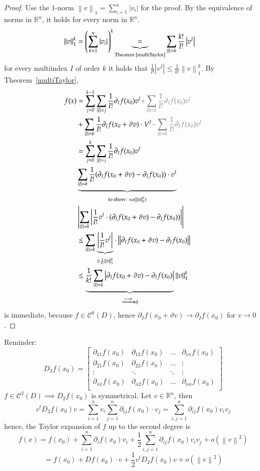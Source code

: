 \documentclass{article}
\newcommand{\norm}[1]{\left\|#1\right\|}
\newcommand{\card}[1]{\left|#1\right|}
\begin{document}
\begin{proof}
  Use the $1$-norm $\norm{v}_1 = \sum_{i=1}^n \card{v_i}$ for the proof. By the equivalence of norms in $\mathbb R^n$, it holds for every norm in $\mathbb R^n$.
  \begin{align*}
    \norm{v}_1^k &= \left(\sum_{k=1}^n \card{v_i}\right)^k \underbrace{=}_{\text{Theorem~\ref{multiTaylor}}}
                    \sum_{\card{I} = k} \frac{k!}{I!} \card{v^I}
  \end{align*}
  for every multiindex $I$ of order $k$ it holds that $\frac{1}{I!} \card{v^I} \leq \frac{1}{k!} \norm{v}_1^k$.
  By Theorem~\ref{multiTaylor},
  \begin{align*}
    f(x) &= \sum_{j=0}^{k-1} \sum_{\card{I}=j} \frac{1}{I!} \partial_I f(x_0) v^I {\color{gray} + \sum_{\card{I} = k} \frac{1}{I!} \partial_I f(x_0) v^I} \\
         &+ \sum_{\card{I} = k} \frac{1}{I!} \partial_I f(x_0 + \vartheta v) \cdot V^I {\color{gray} - \sum_{\card{I} = k} \frac{1}{I!} \partial_I f(x_0) v^I} \\
         &= \sum_{j=0}^k \sum_{\card{I}=j} \frac{1}{I!} \partial_I f(x_0) v^I \\
         & \underbrace{\sum_{\card{I}=k} \frac{1}{I!} (\partial_I f(x_0 + \vartheta v) - \partial_I f(x_0)) \cdot v^I}_{\text{to show: } = o(\norm{v}_1^k)} \\
         & \card{\sum_{\card{I} = k} \card{\frac{1}{I!} v^I \cdot (\partial_I f(x_0 + \vartheta v) - \partial_I f(x_0))}} \\
         & \leq \sum_{\card{I} = k} \underbrace{\card{\frac{1}{I!} v^I}}_{\leq \frac{1}{k!} \norm{v}_1^k} \cdot \norm{\partial_I f(x_0 + \vartheta v) - \partial_I f(x_0)} \\
         & \leq \underbrace{\frac{1}{k!} \sum_{\card{I} = k} \card{\partial_I f(x_0 + \vartheta v) - \partial_I f(x_0)}}_{\xrightarrow{v \to 0} 0} \norm{v}_1^k
  \end{align*}
  is immediate, because $f \in \mathcal C^k(D)$, hence $\partial_I f(x_0 + \vartheta v) \to \partial_I f(x_0)$ for $v \to 0$.
\end{proof}

Reminder:
\[
  D_2 f(x_0) = \begin{bmatrix}
    \partial_{11} f(x_0) & \partial_{12} f(x_0) & \dots & \partial_{1n} f(x_0) \\
    \partial_{21} f(x_0) & \partial_{22} f(x_0) & \dots & \vdots \\
    \vdots & \ddots & \ddots & \vdots \\
    \partial_{n1} f(x_0) & \partial_{n2} f(x_0) & \dots & \partial_{nn} f(x_0) \\
  \end{bmatrix}
\]
$f \in \mathcal C^2(D) \implies D_2 f(x_0)$ is symmetrical.
Let $v \in \mathbb R^n$, then
\[ v^t D_2 f(x_0) v = \sum_{i=1}^n v_i \sum_{j=1}^n \partial_{ij} f(x_0) \cdot v_j = \sum_{i,j=1}^n \partial_{ij} f(x_0) v_i v_j \]
hence, the Taylor expansion of $f$ up to the second degree is
\[ f(x) = f(x_0) + \sum_{i=1}^n \partial_i f(x_0) v_i + \frac12 \sum_{i,j=1}^n \partial_{ij} f(x_0) v_i v_j + o(\norm{v}^2) \]
\[ = f(x_0) + Df(x_0) \cdot v + \frac12 v^t D_2 f(x_0) v + o(\norm{v}^2) \]
\end{document}
